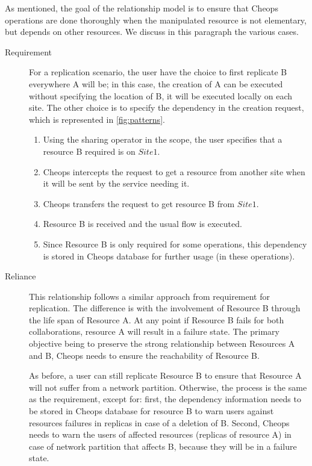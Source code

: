 As mentioned, the goal of the relationship model is to ensure that
Cheops operations are done thoroughly when the manipulated resource is
not elementary, but depends on other resources.
%
We discuss in this paragraph the various cases.

\begin{description}
\item[Requirement]%
  For a replication scenario, the user have the choice to first
  replicate B everywhere A will be; in this case, the creation of A
  can be executed without specifying the location of B, it will be
  executed locally on each site.
  The other choice is to specify the dependency in the creation
  request, which is represented in \autoref{fig:patterns}.
\begin{enumerate}
\item Using the sharing operator in the scope, the user specifies that
  a resource B required is on $Site 1$.
\item Cheops intercepts the request to get a resource from another
  site when it will be sent by the service needing it.
\item Cheops transfers the request to get resource B from $Site 1$.
\item Resource B is received and the usual flow is executed.
\item Since Resource B is only required for some operations, this
  dependency is stored in Cheops database for further usage (in these
  operations).
\end{enumerate}


\item[Reliance] This relationship follows a similar approach from
  requirement for replication.
  The difference is with the involvement of Resource B through the
  life span of Resource A.
  At any point if Resource B fails for both collaborations, resource A
  will result in a failure state.
  The primary objective being to preserve the strong relationship
  between Resources A and B, Cheops needs to ensure the
  reachability of Resource B.

  As before, a user can still replicate Resource B to ensure that
  Resource A will not suffer from a network partition.
  Otherwise, the process is the same as the requirement, except for:
  first, the dependency information needs to be stored in Cheops
  database for resource B to warn users against resources failures in
  replicas in case of a deletion of B.
  Second, Cheops needs to warn the users of affected resources
  (replicas of resource A) in case of network partition that affects
  B, because they will be in a failure state.


\end{description}
